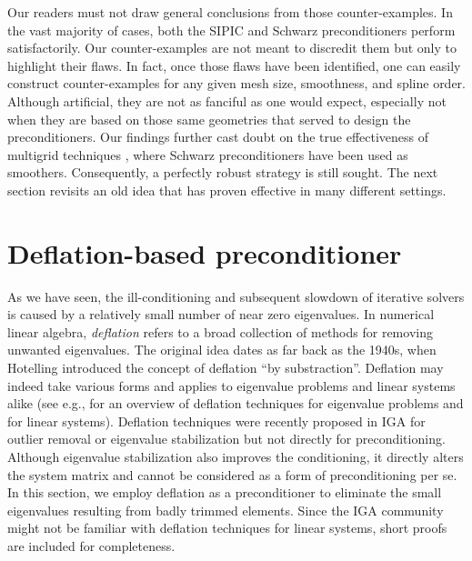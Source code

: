 \documentclass{article}
\numberwithin{equation}{section}
\theoremstyle{definition}
\begin{document}
Our readers must not draw general conclusions from those counter-examples. In the vast majority of cases, both the SIPIC and Schwarz preconditioners perform satisfactorily. Our counter-examples are not meant to discredit them but only to highlight their flaws. In fact, once those flaws have been identified, one can easily construct counter-examples for any given mesh size, smoothness, and spline order. Although artificial, they are not as fanciful as one would expect, especially not when they are based on those same geometries that served to design the preconditioners. Our findings further cast doubt on the true effectiveness of multigrid techniques \cite{de2020multigrid,jomo2021hierarchical}, where Schwarz preconditioners have been used as smoothers. Consequently, a perfectly robust strategy is still sought. The next section revisits an old idea that has proven effective in many different settings.

\section{Deflation-based preconditioner}
\label{se: deflation}
As we have seen, the ill-conditioning and subsequent slowdown of iterative solvers is caused by a relatively small number of near zero eigenvalues. In numerical linear algebra, \emph{deflation} refers to a broad collection of methods for removing unwanted eigenvalues. The original idea dates as far back as the 1940s, when Hotelling \cite{hotelling1943some} introduced the concept of deflation ``by substraction''. Deflation may indeed take various forms and applies to eigenvalue problems and linear systems alike (see e.g., \citep{parlett1998symmetric, saad2011numerical} for an overview of deflation techniques for eigenvalue problems and \cite{frank2001construction,tang2009comparison} for linear systems). Deflation techniques were recently proposed in IGA for outlier removal \cite{voet2026mass} or eigenvalue stabilization \cite{eisentrager2024eigenvalue,burchner2026generalized} but not directly for preconditioning. Although eigenvalue stabilization also improves the conditioning, it directly alters the system matrix and cannot be considered as a form of preconditioning per se. In this section, we employ deflation as a preconditioner to eliminate the small eigenvalues resulting from badly trimmed elements. Since the IGA community might not be familiar with deflation techniques for linear systems, short proofs are included for completeness.
\end{document}
